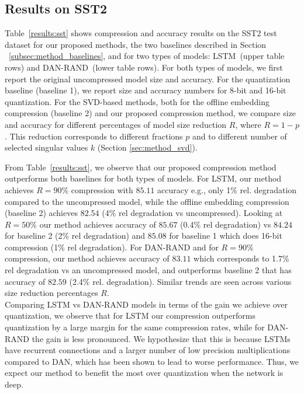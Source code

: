 \subsection{Results on SST2 }
Table~\ref{results:sst} shows compression and accuracy results on the SST2 test dataset
for our proposed methods, the two baselines described in Section
~\ref{subsec:method_baselines}, and for two types of models: LSTM~(upper table
rows) and DAN-RAND~(lower table rows). For both types of models, we first report the
original uncompressed model size and accuracy.  For the quantization baseline
(baseline 1), we report size and accuracy numbers for 8-bit and 16-bit
quantization. For the SVD-based methods, both for the offline embedding
compression (baseline 2) and our proposed compression method, we compare size
and accuracy for different percentages of model size reduction $R$, where $R=1-p$. This reduction
corresponds to different fractions $p$ and to different number of selected singular values
$k$ (Section \ref{sec:method_svd}).


From Table~\ref{results:sst}, we observe that our proposed compression method
outperforms both baselines for both types of models. For LSTM, our method achieves
$R=90\%$ compression with $85.11$ accuracy e.g., only 1\% rel. degradation
compared to the uncompressed model, while the offline embedding compression
(baseline 2) achieves $82.54$ (4\% rel degradation vs uncompressed). Looking at
$R=50\%$ our method achieves accuracy of $85.67$ (0.4\% rel degradation) vs
$84.24$ for baseline 2 (2\% rel degradation) and $85.08$ for baseline 1 which
does 16-bit compression (1\% rel degradation).  For DAN-RAND and for $R=90\%$ compression, our method achieves accuracy of $83.11$ which corresponds to 1.7\% rel
degradation vs an uncompressed model, and outperforms baseline 2 that has
accuracy of $82.59$ (2.4\% rel. degradation). Similar trends are seen across
various size reduction percentages $R$. \\
Comparing LSTM vs DAN-RAND models in terms of the gain we achieve over quantization, we observe that for LSTM our compression outperforms quantization by a large margin for the same compression rates, while for DAN-RAND the gain is less pronounced. We hypothesize that this is because LSTMs have recurrent connections and a larger number of low precision multiplications compared to DAN, which has been shown to lead to worse performance\cite{lin2015neural}. Thus, we expect our method to benefit the most over quantization when the network is deep.


